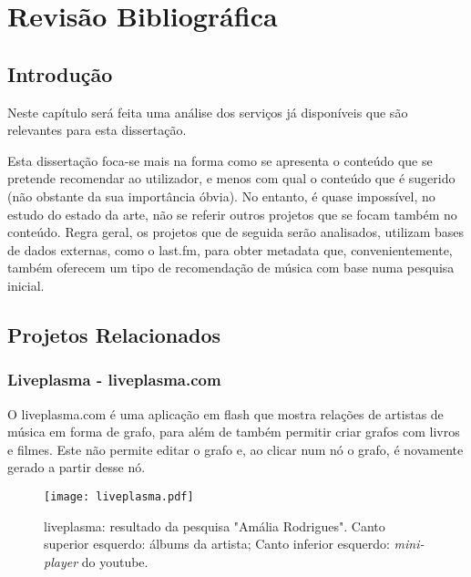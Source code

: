 
\chapter{Revisão Bibliográfica} \label{chap:chap2}

\section*{}

\section{Introdução}

Neste capítulo será feita uma análise dos serviços já disponíveis que são relevantes para esta dissertação.

Esta dissertação foca-se mais na forma como se apresenta o conteúdo que se pretende recomendar ao utilizador, e menos com qual o conteúdo que é sugerido (não obstante da sua importância óbvia).
No entanto, é quase impossível, no estudo do estado da arte, não se referir outros projetos que se focam também no conteúdo.
Regra geral, os projetos que de seguida serão analisados, utilizam bases de dados externas, como o last.fm, para obter metadata que, convenientemente, também oferecem um tipo de recomendação de música com base numa pesquisa inicial.

\section{Projetos Relacionados} %
\label{sec:projetos_relacionados}

\subsection{Liveplasma - liveplasma.com} %
\label{sub:liveplasma}

O liveplasma.com é uma aplicação em flash que mostra relações de artistas de música em forma de grafo, para além de também permitir criar grafos com livros e filmes.
Este não permite editar o grafo e, ao clicar num nó o grafo, é novamente gerado a partir desse nó.

\begin{figure}[tb]
  \begin{center}
    \texttt{[image: liveplasma.pdf]}
  \end{center}
  \caption{liveplasma: resultado da pesquisa "Amália Rodrigues". Canto superior esquerdo: álbums da artista; Canto inferior esquerdo: \emph{mini-player} do youtube.}
  \label{fig:sota_liveplasma}
\end{figure}

